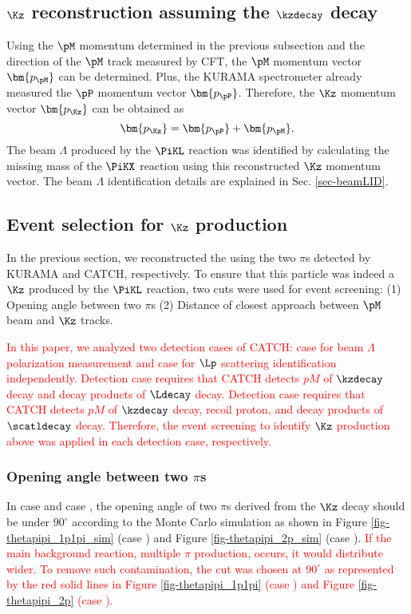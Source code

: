 \clearpage
\subsection{$\Kz$ reconstruction assuming the $\kzdecay$ decay}
Using the $\pM$ momentum determined in the previous subsection and the direction of the $\pM$ track measured by CFT, the $\pM$ momentum vector $\bm{p_{\pM}}$ can be determined. Plus, the KURAMA spectrometer already measured the $\pP$ momentum vector $\bm{p_{\pP}}$. Therefore, the $\Kz$ momentum vector $\bm{p_{\Kz}}$ can be obtained as
\begin{equation}
  \bm{p_{\Kz}} = \bm{p_{\pP}} + \bm{p_{\pM}}.
\end{equation}
The beam $\Lambda$ produced by the $\PiKL$ reaction was identified by calculating the missing mass of the $\PiKX$ reaction using this reconstructed $\Kz$ momentum vector. The beam $\Lambda$ identification details are explained in Sec. \ref{sec-beamLID}.

\subsection{Event selection for $\Kz$ production}
\label{sec-Lbeam-EVselect}
In the previous section, we reconstructed the  using the two $\pi$s detected by KURAMA and CATCH, respectively. To ensure that this particle was indeed a $\Kz$ produced by the $\PiKL$ reaction, two cuts were used for event screening: (1) Opening angle between two $\pi$s (2) Distance of closest approach between $\pM$ beam and $\Kz$ tracks. 

\textcolor{red}{ In this paper, we analyzed two detection cases of CATCH: case  for beam $\Lambda$ polarization measurement and case  for $\Lp$ scattering identification independently. Detection case  requires that CATCH detects $pM$ of $\kzdecay$ decay and decay products of $\Ldecay$ decay. Detection case  requires that CATCH detects $pM$ of $\kzdecay$ decay, recoil proton, and decay products of $\scatldecay$ decay. Therefore, the event screening to identify $\Kz$ production above was applied in each detection case, respectively. }




\subsubsection{Opening angle between two $\pi$s}
In case  and case , the opening angle of two $\pi$s derived from the $\Kz$ decay should be under $90^{\circ}$ according to the Monte Carlo simulation as shown in Figure \ref{fig-thetapipi_1p1pi_sim} (case ) and Figure \ref{fig-thetapipi_2p_sim} (case ). \textcolor{red}{ If the main background reaction, multiple $\pi$ production, occurs, it would distribute wider. To remove such contamination, the cut was chosen at $90^{\circ}$ as represented by the red solid lines in Figure \ref{fig-thetapipi_1p1pi} (case ) and Figure \ref{fig-thetapipi_2p} (case ). }

